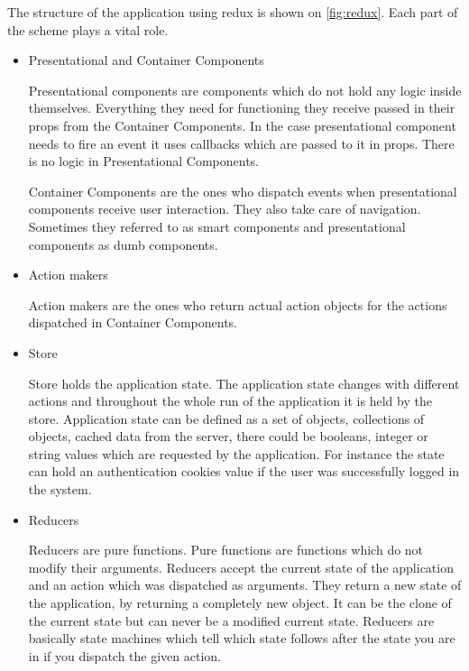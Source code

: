 \documentclass[thesis=M,english]{FITthesis}[2012/10/20]
\begin{document}
The structure of the application using redux is shown on \ref{fig:redux}. Each part of the scheme plays a vital role.
\begin{itemize}
\item{Presentational and Container Components}

Presentational components are components which do not hold any logic inside themselves. Everything they need for functioning they receive passed in their props from the Container Components. In the case presentational component needs to fire an event it uses callbacks which are passed to it in props. There is no logic in Presentational Components.


Container Components are the ones who dispatch events when presentational components receive user interaction. They also take care of navigation. Sometimes they referred to as smart components and presentational components as dumb components.

\item{Action makers}

Action makers are the ones who return actual action objects for the actions dispatched in Container Components.

\item{Store}

Store holds the application state. The application state changes with different actions and throughout the whole run of the application it is held by the store. Application state can be defined as a set of objects, collections of objects, cached data from the server, there could be booleans, integer or string values which are requested by the application. For instance the state can hold an authentication cookies value if the user was successfully logged in the system.

\item{Reducers}

Reducers are pure functions. Pure functions are functions which do not modify their arguments. Reducers accept the current state of the application and an action which was dispatched as arguments. They return a new state of the application, by returning a completely new object. It can be the clone of the current state but can never be a modified current state. Reducers are basically state machines which tell which state follows after the state you are in if you dispatch the given action.

\end{itemize}
\end{document}

